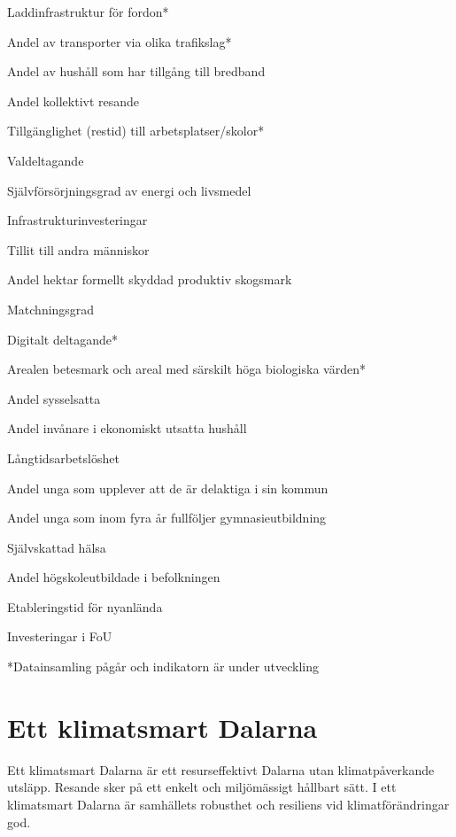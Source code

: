 \documentclass[
]{article}
\begin{document}
{Laddinfrastruktur för fordon* }

{Andel av transporter via olika trafikslag* }

{Andel av hushåll som har tillgång till bredband }

{Andel kollektivt resande }

{Tillgänglighet (restid) till arbetsplatser/skolor* }

{Valdeltagande }

{Självförsörjningsgrad av energi och livsmedel }

{Infrastrukturinvesteringar }

{Tillit till andra människor }

{Andel hektar formellt skyddad produktiv skogsmark }

{Matchningsgrad }

{Digitalt deltagande* }

Arealen betesmark och areal med särskilt höga biologiska värden*

{Andel sysselsatta }

{Andel invånare i ekonomiskt utsatta hushåll }

{ }

{Långtidsarbetslöshet }

{Andel unga som upplever att de är delaktiga i sin kommun}

{ }

{Andel unga som inom fyra år fullföljer gymnasieutbildning}

{Självskattad hälsa }

{ }

{Andel högskoleutbildade i befolkningen }

{ }

{ }

{Etableringstid för nyanlända }

{ }

{ }

{Investeringar i FoU }

{ }

*Datainsamling pågår och indikatorn är under utveckling

\hypertarget{ett-klimatsmart-dalarna}{%
\section{Ett klimatsmart Dalarna}\label{ett-klimatsmart-dalarna}}

Ett klimatsmart Dalarna är ett resurseffektivt Dalarna utan
klimatpåverkande utsläpp. Resande sker på ett enkelt och miljömässigt
hållbart sätt. I ett klimatsmart Dalarna är samhällets robusthet och
resiliens vid klimatförändringar god.
\end{document}
